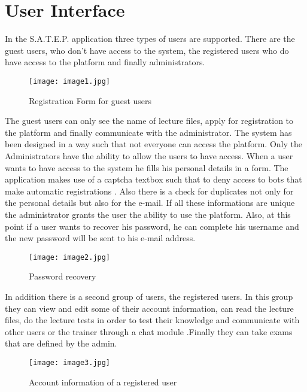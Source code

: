\documentclass[10pt, conference, compsocconf]{IEEEtran}
\begin{document}
 
 

\section{User Interface}

 In the  S.A.T.E.P. application three types of users are supported. There are the guest users, who don’t have access to the system, the registered users who do have access to the platform and finally administrators. 
\begin{figure}[!h]
	\centering
	\texttt{[image: image1.jpg]}
	\caption{Registration Form for guest users}
\end{figure}

The guest users can only see the name of lecture files, apply for registration to the platform and finally communicate with the administrator. The system has been designed in a way such that not everyone can access the platform. Only the Administrators have the ability  to allow the users to have access. When a user wants to have access to the system he fills  his personal details in a form.  The application makes use of  a captcha textbox such that to deny access to bots that make automatic registrations . Also there is  a check for duplicates  not only for the personal details but also for the  e-mail. If all these  informations  are unique  the administrator  grants the user the ability to use the platform. Also, at this point if a user wants to recover his password, he can complete his username and the new password will be sent to his e-mail address. 

\begin{figure}[!h]
	\centering
	\texttt{[image: image2.jpg]}
	\caption{Password recovery}
\end{figure} 

 
In addition  there is a second group of users, the registered users. In this group they can view and edit some of their account information, can read the lecture files, do the lecture tests in order to test their knowledge and communicate with other users or the trainer through a chat module .Finally they can take exams that are defined by the admin.

\begin{figure}[!h]
	\centering
	\texttt{[image: image3.jpg]}
	\caption{Account information of a registered user}
\end{figure} 
\end{document}
